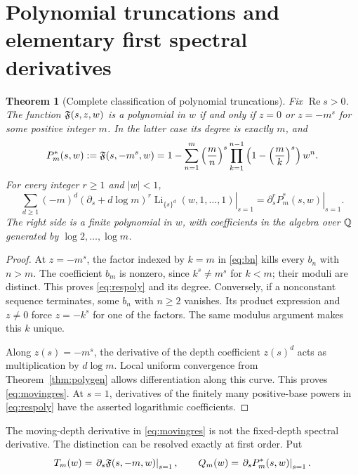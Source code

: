 \documentclass[11pt]{article}
\numberwithin{equation}{section}
\newtheorem{theorem}{Theorem}[section]
\theoremstyle{definition}\newtheorem{definition}[theorem]{Definition}
\theoremstyle{remark}\newtheorem{remark}[theorem]{Remark}
\DeclareMathOperator{\Li}{Li}
\DeclareMathOperator{\Rea}{Re}
\begin{document}
\section{Polynomial truncations and elementary first spectral derivatives}
\label{sec:resonance}
\begin{theorem}[Complete classification of polynomial truncations]
\label{thm:truncate}
Fix $\Rea s>0$. The function $\mathfrak F(s,z,w)$ is a polynomial in $w$ if and only
if $z=0$ or $z=-m^s$ for some positive integer $m$. In the latter case its
degree is exactly $m$, and
\begin{equation}
 P_m^*(s,w):=\mathfrak F(s,-m^s,w)
 =1-\sum_{n=1}^m\left(\frac mn\right)^s
    \prod_{k=1}^{n-1}\left(1-\left(\frac mk\right)^s\right)w^n.
 \label{eq:respoly}
\end{equation}
For every integer $r\ge1$ and $|w|<1$,
\begin{equation}
 \boxed{\sum_{d\ge1}(-m)^d
   \left.(\partial_s+d\log m)^r
       \Li_{\{s\}^d}(w,1,\ldots,1)\right|_{s=1}
       =\left.\partial_s^rP_m^*(s,w)\right|_{s=1}}.
 \label{eq:movingres}
\end{equation}
The right side is a finite polynomial in $w$, with coefficients in the
algebra over $\mathbb Q$ generated by $\log 2,\ldots,\log m$.
\end{theorem}
\begin{proof}
At $z=-m^s$, the factor indexed by $k=m$ in \eqref{eq:bn} kills every
$b_n$ with $n>m$. The coefficient $b_m$ is nonzero, since
$k^s\ne m^s$ for $k<m$; their moduli are distinct. This proves
\eqref{eq:respoly} and its degree. Conversely, if a nonconstant sequence
terminates, some $b_n$ with $n\ge2$ vanishes. Its product expression and
$z\ne0$ force $z=-k^s$ for one of the factors. The same modulus argument
makes this $k$ unique.

Along $z(s)=-m^s$, the derivative of the depth coefficient $z(s)^d$ acts
as multiplication by $d\log m$. Local uniform convergence from
Theorem~\ref{thm:polygen} allows differentiation along this curve. This
proves \eqref{eq:movingres}. At $s=1$, derivatives of the finitely many
positive-base powers in \eqref{eq:respoly} have the asserted logarithmic
coefficients.
\end{proof}

The moving-depth derivative in \eqref{eq:movingres} is not the fixed-depth
spectral derivative. The distinction can be resolved exactly at first order.
Put
\begin{equation}
 T_m(w)=\left.\partial_s\mathfrak F(s,-m,w)\right|_{s=1},\qquad
 Q_m(w)=\left.\partial_sP_m^*(s,w)\right|_{s=1}.
 \label{eq:TQ}
\end{equation}
\end{document}
